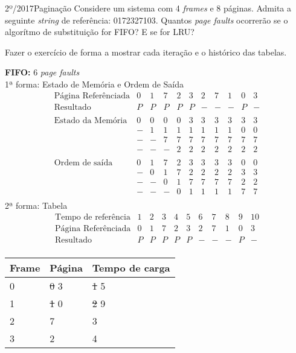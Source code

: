\begin{exercicio}
  {2º/2017}{Paginação}
  {Considere um sistema com 4 \textit{frames} e 8 páginas. Admita a seguinte \textit{string} de referência: 0172327103. Quantos \textit{page faults} ocorrerão se o algorítmo de substituição for FIFO? E se for LRU?}
  \label{ex:pagination-1}

  Fazer o exercício de forma a mostrar cada iteração e o histórico das tabelas.

  \textbf{FIFO:} 6 \textit{page faults} \\
  1ª forma: Estado de Memória e Ordem de Saída
  \[
  \begin{array}{rcccccccccc}
    \text{Página Referênciada}
    & 0 & 1 & 7 & 2 & 3 & 2 & 7 & 1 & 0 & 3 \\ \hline
    \text{Resultado}
    & P & P & P & P & P & - & - & - & P & - \\
    \\
    \text{Estado da Memória}
    & 0 & 0 & 0 & 0 & 3 & 3 & 3 & 3 & 3 & 3 \\
    & - & 1 & 1 & 1 & 1 & 1 & 1 & 1 & 0 & 0 \\
    & - & - & 7 & 7 & 7 & 7 & 7 & 7 & 7 & 7 \\
    & - & - & - & 2 & 2 & 2 & 2 & 2 & 2 & 2 \\
    \\
    \text{Ordem de saída}
    & 0 & 1 & 7 & 2 & 3 & 3 & 3 & 3 & 0 & 0 \\
    & - & 0 & 1 & 7 & 2 & 2 & 2 & 2 & 3 & 3 \\
    & - & - & 0 & 1 & 7 & 7 & 7 & 7 & 2 & 2 \\
    & - & - & - & 0 & 1 & 1 & 1 & 1 & 7 & 7 \\
  \end{array}
  \]
2ª forma: Tabela
\[
\begin{array}{rcccccccccc}
  \text{Tempo de referência}
    & 1 & 2 & 3 & 4 & 5 & 6 & 7 & 8 & 9 & 10 \\ \hline
  \text{Página Referênciada}
    & 0 & 1 & 7 & 2 & 3 & 2 & 7 & 1 & 0 & 3 \\ \hline
  \text{Resultado}
    & P & P & P & P & P & - & - & - & P & - \\
\end{array}
 \]
\begin{table}[H]
  \centering
  \begin{tabular}{lll}
    \hline \hline
    \textbf{Frame}  & \textbf{Página}                   & \textbf{Tempo de carga} \\ \hline
    0               & \sout{0} 3                        & \sout{1} 5 \\
    1               & \sout{1} 0                        & \sout{2} 9 \\
    2               & 7                                 & 3 \\
    3               & 2                                 & 4 \\
    \hline \hline
  \end{tabular}
\end{table}


\end{exercicio}
